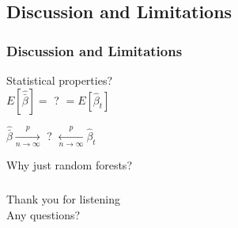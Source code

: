 \documentclass{beamer}
\begin{document}
\subsection{Discussion and Limitations}
\begin{frame}

\frametitle{Discussion and Limitations}
\pause
\begin{center}
Statistical properties? \\ \vspace{5mm} \pause
$E[\hat{\bar{\beta}}] =$ ? $= E[\hat{\beta}_t]$ \\ \vspace{5mm} \pause

$ \hat{\bar{\beta}} \xrightarrow[n \rightarrow \infty]{p} $ ? $ \xleftarrow[n \rightarrow \infty]{p} \hat{\beta}_t$ \hspace{1mm} \pause \\ \vspace{5mm}

Why just random forests?
\end{center}
\end{frame}

\begin{frame}
\frametitle{}
Thank you for listening \\ \vspace{10mm} 
\pause
Any questions?
\end{frame}
\end{document}
